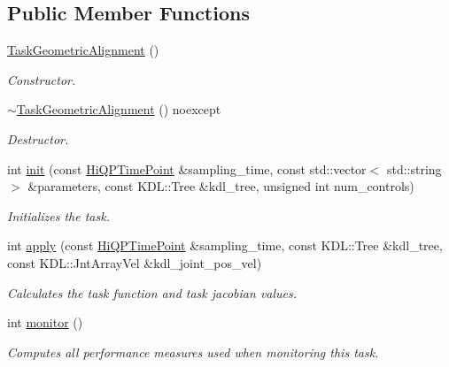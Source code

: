 \subsection*{Public Member Functions}
\begin{DoxyCompactItemize}
\item 
\hypertarget{classhiqp_1_1TaskGeometricAlignment_a8f089ad7dab000f343341a159c61a0ca}{\hyperlink{classhiqp_1_1TaskGeometricAlignment_a8f089ad7dab000f343341a159c61a0ca}{Task\-Geometric\-Alignment} ()}\label{classhiqp_1_1TaskGeometricAlignment_a8f089ad7dab000f343341a159c61a0ca}

\begin{DoxyCompactList}\small\item\em Constructor. \end{DoxyCompactList}\item 
\hypertarget{classhiqp_1_1TaskGeometricAlignment_a94c787691eeafd7ca1f7979c54aa79e4}{\hyperlink{classhiqp_1_1TaskGeometricAlignment_a94c787691eeafd7ca1f7979c54aa79e4}{$\sim$\-Task\-Geometric\-Alignment} () noexcept}\label{classhiqp_1_1TaskGeometricAlignment_a94c787691eeafd7ca1f7979c54aa79e4}

\begin{DoxyCompactList}\small\item\em Destructor. \end{DoxyCompactList}\item 
int \hyperlink{classhiqp_1_1TaskGeometricAlignment_a532c586ac698619c0f2d18fe44253bec}{init} (const \hyperlink{classhiqp_1_1HiQPTimePoint}{Hi\-Q\-P\-Time\-Point} \&sampling\-\_\-time, const std\-::vector$<$ std\-::string $>$ \&parameters, const K\-D\-L\-::\-Tree \&kdl\-\_\-tree, unsigned int num\-\_\-controls)
\begin{DoxyCompactList}\small\item\em Initializes the task. \end{DoxyCompactList}\item 
int \hyperlink{classhiqp_1_1TaskGeometricAlignment_a85bec9aead639a94c50b951df6bf076e}{apply} (const \hyperlink{classhiqp_1_1HiQPTimePoint}{Hi\-Q\-P\-Time\-Point} \&sampling\-\_\-time, const K\-D\-L\-::\-Tree \&kdl\-\_\-tree, const K\-D\-L\-::\-Jnt\-Array\-Vel \&kdl\-\_\-joint\-\_\-pos\-\_\-vel)
\begin{DoxyCompactList}\small\item\em Calculates the task function and task jacobian values. \end{DoxyCompactList}\item 
int \hyperlink{classhiqp_1_1TaskGeometricAlignment_a1cede66f4e9b5e558dbcdaaf7e11e2c4}{monitor} ()
\begin{DoxyCompactList}\small\item\em Computes all performance measures used when monitoring this task. \end{DoxyCompactList}\end{DoxyCompactItemize}
